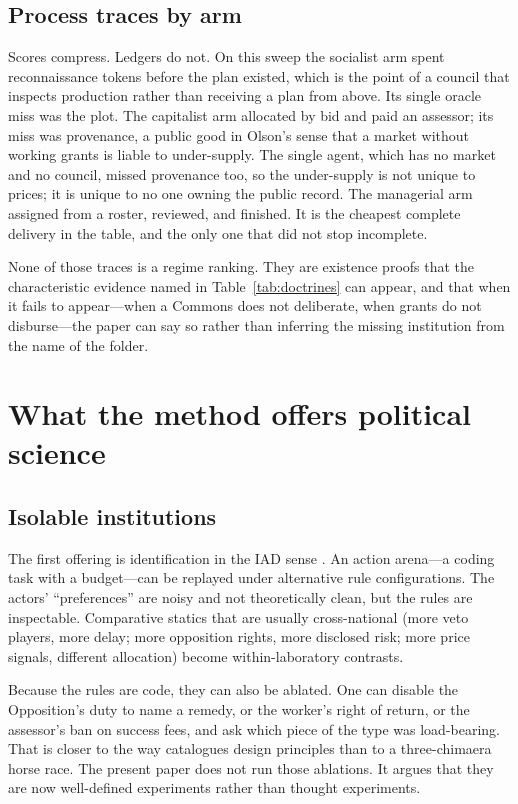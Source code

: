 \documentclass[11pt,a4paper]{article}
\begin{document}
\subsection{Process traces by arm}

Scores compress. Ledgers do not. On this sweep the socialist arm spent reconnaissance
tokens before the plan existed, which is the point of a council that inspects production
rather than receiving a plan from above. Its single oracle miss was the plot. The
capitalist arm allocated by bid and paid an assessor; its miss was provenance, a public
good in Olson's sense that a market without working grants is liable to under-supply.
The single agent, which has no market and no council, missed provenance too, so the
under-supply is not unique to prices; it is unique to no one owning the public record.
The managerial arm assigned from a roster, reviewed, and finished. It is the cheapest
complete delivery in the table, and the only one that did not stop incomplete.

None of those traces is a regime ranking. They are existence proofs that the
characteristic evidence named in Table~\ref{tab:doctrines} can appear, and that when it
fails to appear---when a Commons does not deliberate, when grants do not disburse---the
paper can say so rather than inferring the missing institution from the name of the
folder.

\section{What the method offers political science}
\label{sec:discussion}

\subsection{Isolable institutions}

The first offering is identification in the IAD sense \citep{ostrom2005}. An action
arena---a coding task with a budget---can be replayed under alternative rule
configurations. The actors' ``preferences'' are noisy and not theoretically clean, but
the rules are inspectable. Comparative statics that are usually cross-national (more veto
players, more delay; more opposition rights, more disclosed risk; more price signals,
different allocation) become within-laboratory contrasts.

Because the rules are code, they can also be ablated. One can disable the Opposition's
duty to name a remedy, or the worker's right of return, or the assessor's ban on success
fees, and ask which piece of the type was load-bearing. That is closer to the way
\citet{ostrom1990} catalogues design principles than to a three-chimaera horse race.
The present paper does not run those ablations. It argues that they are now well-defined
experiments rather than thought experiments.
\end{document}
